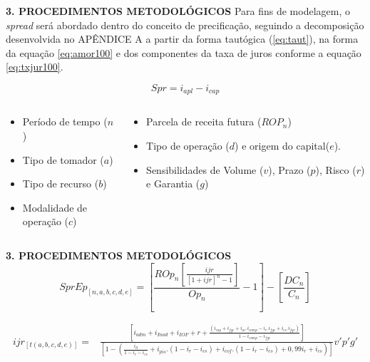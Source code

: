 \documentclass[
  ignorenonframetext,
  aspectratio=169,
  ignorenonframetext]{beamer}
\providecommand{\tightlist}{%
  \setlength{\itemsep}{0pt}\setlength{\parskip}{0pt}}
\begin{document}
\begin{frame}{\textbf{3. PROCEDIMENTOS METODOLÓGICOS}}
\protect\hypertarget{procedimentos-metodoluxf3gicos-3}{}
Para fins de modelagem, o \emph{spread} será abordado dentro do conceito
de precificação, seguindo a decomposição desenvolvida no APÊNDICE A a
partir da forma tautógica (\autoref{eq:taut}), na forma da equação
\autoref{eq:amor100} e dos componentes da taxa de juros conforme a
equação \autoref{eq:txjur100}.

\begin{equation}\label{eq:taut}
Spr = i_{apl} - i_{cap} 
\end{equation}

\begin{columns}[T]
\begin{column}{0.6\textwidth}
\begin{itemize}
\tightlist
\item
  Período de tempo (\(n\))
\item
  Tipo de tomador (\(a\))
\item
  Tipo de recurso (\(b\))
\item
  Modalidade de operação (\(c\))
\end{itemize}
\end{column}

\begin{column}{0.4\textwidth}
\begin{itemize}
\tightlist
\item
  Parcela de receita futura (\(ROP_{n}\))
\item
  Tipo de operação (\(d\)) e origem do capital(\(e\)).
\item
  Sensibilidades de Volume (\(v\)), Prazo (\(p\)), Risco (\(r\)) e
  Garantia (\(g\))
\end{itemize}
\end{column}
\end{columns}
\end{frame}

\begin{frame}{\textbf{3. PROCEDIMENTOS METODOLÓGICOS}}
\protect\hypertarget{procedimentos-metodoluxf3gicos-4}{}
\begin{equation}\label{eq:amor100}
SprEp_{[n,a,b,c,d,e]} = \left[ \frac{ROp_{n}[\frac{   ijr_{}  }{  [1 + ijr_{}]^n -1  }]}{Op_{n}} -1 \right] - \left[ \frac{DC_{n}}{C_{n}} \right]
\end{equation}

\begin{equation}\label{eq:txjur100}
\begin{aligned}
ijr_{[t(a,b,c,d,e)]} = & \frac{[i_{adm} + i_{Inad} + i_{IOF} + r +  \frac{(i_{cap} + i_{fgc} + i_{ac}.i_{comp} - i_{r}.i_{fgc}+ i_{cs}.i_{fgc})}{1 - i_{comp} - i_{fgc}}]}
{[1 - (\frac{i_{ll}}{1 - i_{r} - i_{cs}} + i_{pis}.(1 - i_{r} - i_{cs}) + i_{cof}.(1 - i_{r} - i_{cs}) + 0,99i_{r} + i_{cs})]}v'p'g'
\end{aligned}
\end{equation}
\end{frame}
\end{document}

